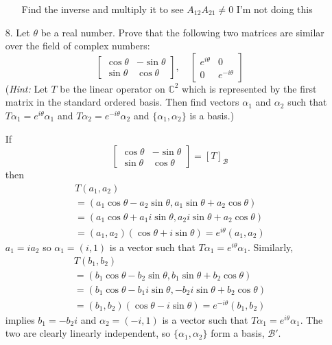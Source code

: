 \documentclass{article}
\begin{document}
\begin{enumerate}[listparindent=\parindent]
\begin{enumerate}[listparindent=\parindent]
            Find the inverse and multiply it to see \(A_{12}A_{21} \neq 0\) I'm not doing this
    \end{enumerate}

\item[8.] Let \(\theta\) be a real number. Prove that the following two matrices are similar over the field of complex numbers:
    \[
        \begin{bmatrix} \cos \theta & -\sin \theta \\ \sin \theta & \cos \theta \end{bmatrix}, \quad
        \begin{bmatrix} e^{i\theta} & 0 \\ 0 & e^{-i\theta} \end{bmatrix}
    \]
    (\textit{Hint:} Let \(T\) be the linear operator on \(\mathbb{C}^2\) which is represented by the first matrix in the standard ordered basis.
    Then find vectors \(\alpha_1\) and \(\alpha_2\) such that \(T\alpha_1 = e^{i\theta}\alpha_1\) and \(T\alpha_2 = e^{-i\theta}\alpha_2\)
    and \(\{\alpha_1, \alpha_2\}\) is a basis.)

    If \[ \begin{bmatrix} \cos \theta & -\sin \theta \\ \sin \theta & \cos \theta \end{bmatrix} = [T]_{\mathcal{B}} \]
    then
    \begin{gather*}
        T(a_1, a_2) \\
        = (a_1\cos\theta - a_2\sin\theta, a_1\sin\theta + a_2\cos\theta) \\
        = (a_1\cos\theta + a_1i\sin\theta, a_2i\sin\theta + a_2\cos\theta) \\
        = (a_1, a_2)(\cos\theta + i\sin\theta) = e^{i\theta}(a_1, a_2)
    \end{gather*}
    \(a_1 = ia_2\) so \(\alpha_1 = (i, 1)\) is a vector such that \(T\alpha_1 = e^{i\theta}\alpha_1\).
    Similarly,
    \begin{gather*}
        T(b_1, b_2) \\
        = (b_1\cos\theta - b_2\sin\theta, b_1\sin\theta + b_2\cos\theta) \\
        = (b_1\cos\theta - b_1i\sin\theta, -b_2i\sin\theta + b_2\cos\theta) \\
        = (b_1, b_2)(\cos\theta - i\sin\theta) = e^{-i\theta}(b_1, b_2)
    \end{gather*}
    implies \(b_1 = -b_2i\) and \(\alpha_2 = (-i, 1)\) is a vector such that \(T\alpha_1 = e^{i\theta}\alpha_1\).
    The two are clearly linearly independent, so \(\{\alpha_1, \alpha_2\}\) form a basis, \(\mathcal{B'}\).


\end{enumerate}
\end{document}
